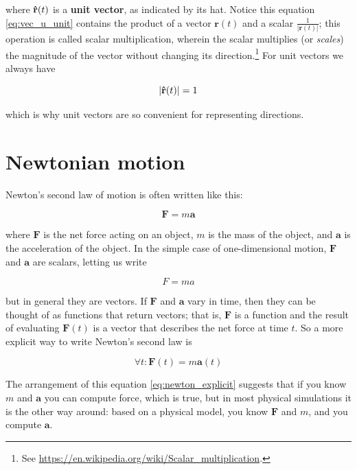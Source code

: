 \documentclass[
]{book}
\renewcommand{\vec}[1]{\bm{\mathbf{#1}}}
\newcommand{\uveci}{{\bm{\hat{\textnormal{\bfseries\i}}}}}
\newcommand{\uvecj}{{\bm{\hat{\textnormal{\bfseries\j}}}}}
\newcommand{\uvec}[1]{%
    \ifthenelse{\equal{#1}{i}}%
        {\uveci}{%
    \ifthenelse{\equal{#1}{j}}%
        {\uvecj}{%
    {\bm{\hat{\mathbf{#1}}}}%
}}}
\newcommand{\norm}[1]{\lvert #1 \rvert}
\begin{document}
where $\uvec{r}(t)$ is a {\bf unit vector}, as indicated by its hat.
Notice this equation \eqref{eq:vec_u_unit} contains the product of a
vector $\vec{r}(t)$ and a scalar $\frac{1}{\norm{\vec{r}(t)}}$; this
operation is called scalar multiplication, wherein the scalar multiplies
(or \textit{scales}) the magnitude of the vector without changing its
direction.\footnote{See
\url{https://en.wikipedia.org/wiki/Scalar_multiplication}.} For unit vectors
we always have

\begin{equation}
    \norm{\uvec{r}(t)} = 1
\end{equation}

which is why unit vectors are so convenient for representing directions.

\section{Newtonian motion}

Newton's second law of motion is often written like this:

\begin{equation}
    \vec{F} = m \vec{a}
\end{equation}

where $\vec{F}$ is the net force acting on an object, $m$ is the
mass of the object, and $\vec{a}$ is the acceleration of the object.
In the simple case of one-dimensional motion,
$\vec{F}$ and $\vec{a}$ are scalars, letting us write

\begin{equation}
    F = m a
\end{equation}

but in general they are vectors. If $\vec{F}$ and $\vec{a}$ vary in time, then they can
be thought of as functions that return vectors; that is, $\vec{F}$ is
a function and the result of evaluating $\vec{F}(t)$ is a vector that
describes the net force at time $t$.  So a more explicit way to
write Newton's second law is

\begin{equation}\label{eq:newton_explicit}
\forall t: \vec{F}(t) = m \vec{a}(t)
\end{equation}

The arrangement of this equation \eqref{eq:newton_explicit} suggests
that if you know $m$ and $\vec{a}$ you can compute force, which is true,
but in most physical simulations it is the other way around:  based on a
physical model, you know $\vec{F}$ and $m$, and you compute $\vec{a}$.
\end{document}
